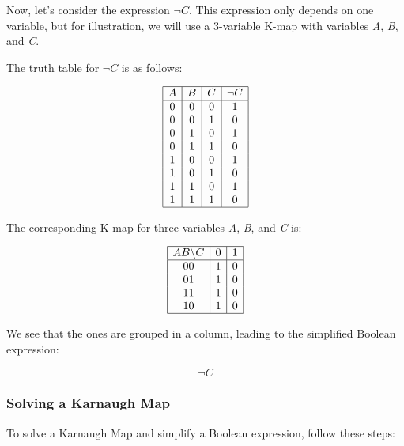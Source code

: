 Now, let's consider the expression \( \neg C \). This expression only 
depends on one variable, but for illustration, we will use a 
3-variable K-map with variables \emph{A}, \emph{B}, and \emph{C}.
\vspace{\baselineskip}

The truth table for \( \neg C \) is as follows:

\[
	\begin{array}{|c|c|c|c|}
		\hline
		A & B & C & \neg C \\
		\hline
		0 & 0 & 0 & 1      \\
		0 & 0 & 1 & 0      \\
		0 & 1 & 0 & 1      \\
		0 & 1 & 1 & 0      \\
		1 & 0 & 0 & 1      \\
		1 & 0 & 1 & 0      \\
		1 & 1 & 0 & 1      \\
		1 & 1 & 1 & 0      \\
		\hline
	\end{array}
\]

The corresponding K-map for three variables \emph{A}, \emph{B}, and \emph{C} is:

\[
	\begin{array}{|c|c|c|c|}
		\hline
		AB \backslash C & 0 & 1 \\
		\hline
		00              & 1 & 0 \\
		01              & 1 & 0 \\
		11              & 1 & 0 \\
		10              & 1 & 0 \\
		\hline
	\end{array}
\]

We see that the ones are grouped in a column, leading to the simplified Boolean expression:

\[
	\neg C
\]

\subsubsection{Solving a Karnaugh Map}

To solve a Karnaugh Map and simplify a Boolean expression, follow these steps:

